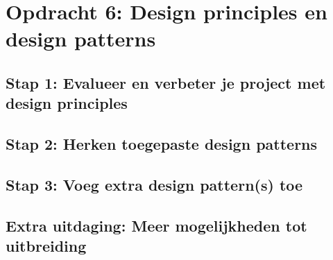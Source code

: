 \chapter{Opdracht 6: Design principles en design patterns}

\section{Stap 1: Evalueer en verbeter je project met design principles}

\section{Stap 2: Herken toegepaste design patterns}

\section{Stap 3: Voeg extra design pattern(s) toe}

\section{Extra uitdaging: Meer mogelijkheden tot uitbreiding}